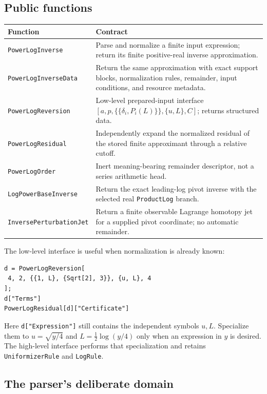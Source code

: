 \documentclass[11pt,a4paper]{article}
\numberwithin{equation}{section}
\theoremstyle{definition}
\theoremstyle{remark}
\newcommand{\code}[1]{\texttt{#1}}
\begin{document}
\subsection{Public functions}

\begin{longtable}{@{}p{}p{}@{}}
\toprule
Function & Contract\\
\midrule
\endhead
\code{PowerLogInverse} & Parse and normalize a finite input expression;
return its finite positive-real inverse approximation.\\[4pt]
\code{PowerLogInverseData} & Return the same approximation with exact
support blocks, normalization rules, remainder, input conditions, and
resource metadata.\\[4pt]
\code{PowerLogReversion} & Low-level prepared-input interface
$[a,p,\{\{\delta_i,P_i(L)\}\},\{u,L\},C]$; returns structured data.\\[4pt]
\code{PowerLogResidual} & Independently expand the normalized residual of
the stored finite approximant through a relative cutoff.\\[4pt]
\code{PowerLogOrder} & Inert meaning-bearing remainder descriptor, not a
series arithmetic head.\\[4pt]
\code{LogPowerBaseInverse} & Return the exact leading-log pivot inverse
with the selected real \code{ProductLog} branch.\\[4pt]
\code{InversePerturbationJet} & Return a finite observable Lagrange homotopy
jet for a supplied pivot coordinate; no automatic remainder.\\
\bottomrule
\end{longtable}

The low-level interface is useful when normalization is already known:
\begin{lstlisting}
d = PowerLogReversion[
 4, 2, {{1, L}, {Sqrt[2], 3}}, {u, L}, 4
];
d["Terms"]
PowerLogResidual[d]["Certificate"]
\end{lstlisting}
Here \code{d["Expression"]} still contains the independent symbols $u,L$.
Specialize them to $u=\sqrt{y/4}$ and $L=\tfrac12\log(y/4)$ only when an
expression in $y$ is desired. The high-level interface performs that
specialization and retains \code{UniformizerRule} and \code{LogRule}.

\subsection{The parser's deliberate domain}
\end{document}
